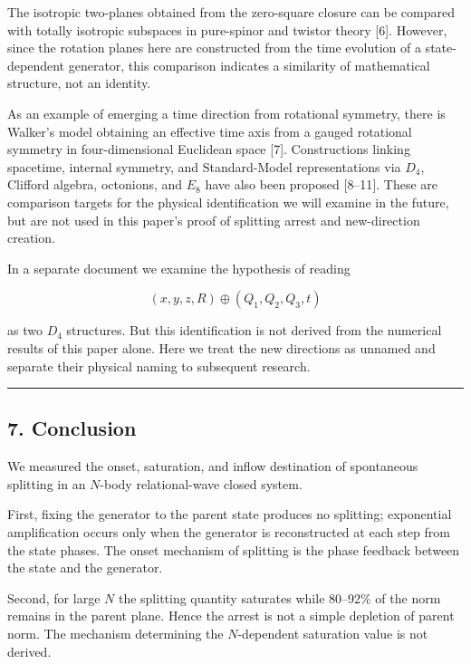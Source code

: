 \documentclass[
  a4paper,
]{article}
\begin{document}
The isotropic two-planes obtained from the zero-square closure can be
compared with totally isotropic subspaces in pure-spinor and twistor
theory {[}6{]}. However, since the rotation planes here are constructed
from the time evolution of a state-dependent generator, this comparison
indicates a similarity of mathematical structure, not an identity.

As an example of emerging a time direction from rotational symmetry,
there is Walker's model obtaining an effective time axis from a gauged
rotational symmetry in four-dimensional Euclidean space {[}7{]}.
Constructions linking spacetime, internal symmetry, and Standard-Model
representations via \(D_4\), Clifford algebra, octonions, and \(E_8\)
have also been proposed {[}8--11{]}. These are comparison targets for
the physical identification we will examine in the future, but are not
used in this paper's proof of splitting arrest and new-direction
creation.

In a separate document we examine the hypothesis of reading

\[
(x,y,z,R)\oplus(Q_1,Q_2,Q_3,t)
\]

as two \(D_4\) structures. But this identification is not derived from
the numerical results of this paper alone. Here we treat the new
directions as unnamed and separate their physical naming to subsequent
research.

\begin{center}\rule{0.5\linewidth}{0.5pt}\end{center}

\subsection{7. Conclusion}\label{conclusion-2}

We measured the onset, saturation, and inflow destination of spontaneous
splitting in an \(N\)-body relational-wave closed system.

First, fixing the generator to the parent state produces no splitting;
exponential amplification occurs only when the generator is
reconstructed at each step from the state phases. The onset mechanism of
splitting is the phase feedback between the state and the generator.

Second, for large \(N\) the splitting quantity saturates while 80--92\%
of the norm remains in the parent plane. Hence the arrest is not a
simple depletion of parent norm. The mechanism determining the
\(N\)-dependent saturation value is not derived.
\end{document}
